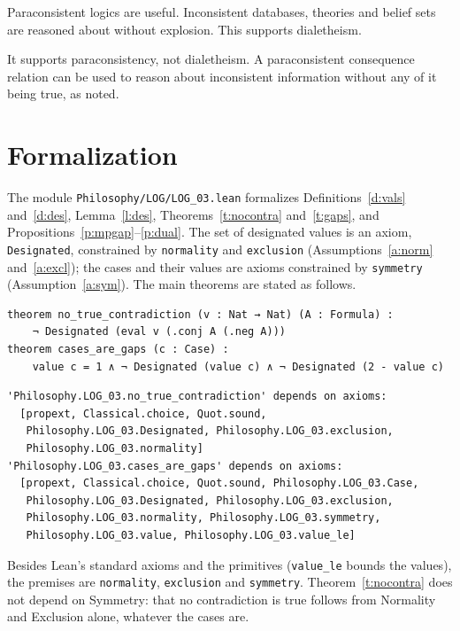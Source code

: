 \documentclass{situationist-preprint}
\begin{document}
\begin{objection}
Paraconsistent logics are useful. Inconsistent databases, theories and belief sets are reasoned about without explosion. This supports dialetheism.
\end{objection}

\begin{reply}
It supports paraconsistency, not dialetheism. A paraconsistent consequence relation can be used to reason about inconsistent information without any of it being true, as \citet{Lewis1982} noted.
\end{reply}

\section{Formalization}

The module \nolinkurl{Philosophy/LOG/LOG_03.lean} formalizes Definitions~\ref{d:vals} and~\ref{d:des}, Lemma~\ref{l:des}, Theorems~\ref{t:nocontra} and~\ref{t:gaps}, and Propositions~\ref{p:mpgap}--\ref{p:dual}. The set of designated values is an axiom, \texttt{Designated}, constrained by \texttt{normality} and \texttt{exclusion} (Assumptions~\ref{a:norm} and~\ref{a:excl}); the cases and their values are axioms constrained by \texttt{symmetry} (Assumption~\ref{a:sym}). The main theorems are stated as follows.

\begin{lstlisting}
theorem no_true_contradiction (v : Nat → Nat) (A : Formula) :
    ¬ Designated (eval v (.conj A (.neg A)))
theorem cases_are_gaps (c : Case) :
    value c = 1 ∧ ¬ Designated (value c) ∧ ¬ Designated (2 - value c)
\end{lstlisting}

\begin{lstlisting}
'Philosophy.LOG_03.no_true_contradiction' depends on axioms:
  [propext, Classical.choice, Quot.sound,
   Philosophy.LOG_03.Designated, Philosophy.LOG_03.exclusion,
   Philosophy.LOG_03.normality]
'Philosophy.LOG_03.cases_are_gaps' depends on axioms:
  [propext, Classical.choice, Quot.sound, Philosophy.LOG_03.Case,
   Philosophy.LOG_03.Designated, Philosophy.LOG_03.exclusion,
   Philosophy.LOG_03.normality, Philosophy.LOG_03.symmetry,
   Philosophy.LOG_03.value, Philosophy.LOG_03.value_le]
\end{lstlisting}

Besides Lean's standard axioms and the primitives (\texttt{value\_le} bounds the values), the premises are \texttt{normality}, \texttt{exclusion} and \texttt{symmetry}. Theorem~\ref{t:nocontra} does not depend on Symmetry: that no contradiction is true follows from Normality and Exclusion alone, whatever the cases are.
\end{document}
